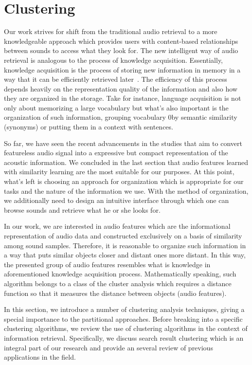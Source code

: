 \section{Clustering}
Our work strives for shift from the traditional audio retrieval to a more knowledgeable approach which provides users with content-based relationships between sounds to access what they look for. The new intelligent way of audio retrieval is analogous to the process of knowledge acquisition. 
Essentially, knowledge acquisition is the process of storing new information in memory in a way that it can be efficiently retrieved later~\cite{danielle2002}. The efficiency of this process depends heavily on the representation quality of the information and also how they are organized in the storage. Take for instance, language acquisition is not only about memorizing a large vocabulary but what's also important is the organization of such information, grouping vocabulary 0by semantic similarity (synonyms) or putting them in a context with sentences.

So far, we have seen the recent advancements in the studies that aim to convert featureless audio signal into a expressive but compact representation of the acoustic information. We concluded in the last section that audio features learned with similarity learning are the most suitable for our purposes. At this point, what's left is choosing an approach for organization which is appropriate for our tasks and the nature of the information we use. With the method of organization, we additionally need to design an intuitive interface through which one can browse sounds and retrieve what he or she looks for.

In our work, we are interested in audio features which are the informational representation of audio data and constructed exclusively on a basis of similarity among sound samples. Therefore, it is reasonable to organize such information in a way that puts similar objects closer and distant ones more distant. In this way, the presented group of audio features resembles what is knowledge in aforementioned knowledge acquisition process. Mathematically speaking, such algorithm belongs to a class of the cluster analysis which requires a distance function so that it measures the distance between objects (audio features).

In this section, we introduce a number of clustering analysis techniques, giving a special importance to the partitional approaches. Before breaking into a specific clustering algorithms, we review the use of clustering algorithms in the context of information retrieval. Specifically, we discuss search result clustering which is an integral part of our research and provide an several review of previous applications in the field.

